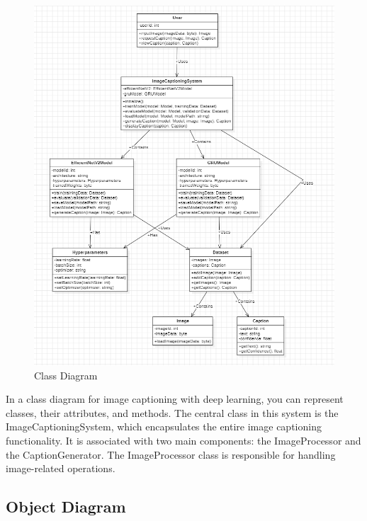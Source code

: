 \documentclass[oneside,a4paper,12pt]{report}
\begin{document}
\begin{figure}[H]
\begin{center}
\includegraphics[width=1.0\linewidth]{class1}
\caption{Class Diagram}
\label{Fig:f4}
\end{center}
\end{figure}
In a class diagram for image captioning with deep learning, you can represent classes, their attributes, and methods. The central class in this system is the ImageCaptioningSystem, which encapsulates the entire image captioning functionality. It is associated with two main components: the ImageProcessor and the CaptionGenerator. The ImageProcessor class is responsible for handling image-related operations.\cite{r6}
\subsection{Object Diagram}
\end{document}
